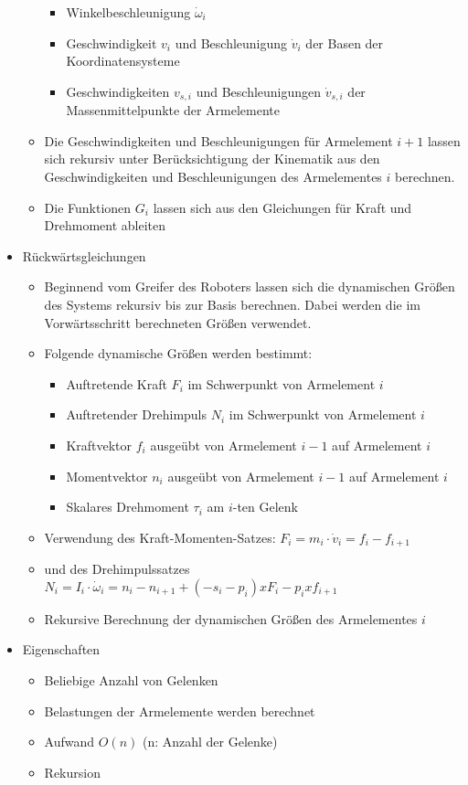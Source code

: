 \documentclass[paper=a4, fontsize=11pt]{scrartcl} %
\numberwithin{equation}{section} %
\numberwithin{figure}{section} %
\numberwithin{table}{section} %
\begin{document}
\begin{itemize}
\begin{itemize}
\begin{itemize}
\item Winkelbeschleunigung $\dot \omega_i$
\item Geschwindigkeit $v_i$ und Beschleunigung $\dot v_i$ der Basen der Koordinatensysteme
\item Geschwindigkeiten $v_{s,i}$ und Beschleunigungen $\dot v_{s,i}$ der Massenmittelpunkte der Armelemente
\end{itemize}
\item Die Geschwindigkeiten und Beschleunigungen für Armelement $i+1$ lassen sich rekursiv unter Berücksichtigung der Kinematik aus den Geschwindigkeiten und Beschleunigungen des Armelementes $i$ berechnen.
\item Die Funktionen $G_i$ lassen sich aus den Gleichungen für Kraft und Drehmoment ableiten
\end{itemize}
\item Rückwärtsgleichungen
\begin{itemize}
\item Beginnend vom Greifer des Roboters lassen sich die dynamischen Größen des Systems rekursiv bis zur Basis berechnen. Dabei werden die im Vorwärtsschritt berechneten Größen verwendet.
\item Folgende dynamische Größen werden bestimmt:
\begin{itemize}
\item Auftretende Kraft $F_i$ im Schwerpunkt von Armelement $i$
\item Auftretender Drehimpuls $N_i$ im Schwerpunkt von Armelement $i$
\item Kraftvektor $f_i$ ausgeübt von Armelement $i-1$ auf Armelement $i$
\item Momentvektor $n_i$ ausgeübt von Armelement $i-1$ auf Armelement $i$
\item Skalares Drehmoment $\tau_i$ am $i$-ten Gelenk
\end{itemize}
\item Verwendung des Kraft-Momenten-Satzes: $F_i = m_i \cdot \dot v_i = f_i - f_{i+1}$
\item und des Drehimpulssatzes $N_i = I_i \cdot \dot \omega_i = n_i - n_{i+1} + (-s_i - p_i) x F_i - p_i x f_{i+1}$
\item Rekursive Berechnung der dynamischen Größen des Armelementes $i$
\end{itemize}
\item Eigenschaften
\begin{itemize}
\item Beliebige Anzahl von Gelenken
\item Belastungen der Armelemente werden berechnet
\item Aufwand $O(n)$ (n: Anzahl der Gelenke)
\item Rekursion
\end{itemize}
\end{itemize}
\end{document}
